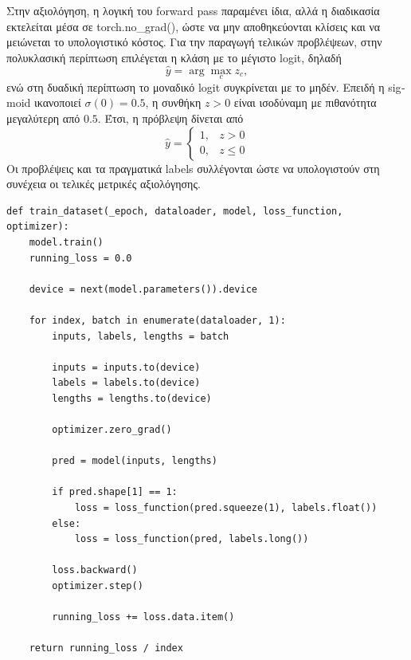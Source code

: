 \documentclass[11pt,a4paper]{article}
\begin{document}
Στην αξιολόγηση, η λογική του \textlatin{forward pass} παραμένει ίδια, αλλά η διαδικασία εκτελείται μέσα σε \textlatin{torch.no\_grad()}, ώστε να 
μην αποθηκεύονται κλίσεις και να μειώνεται το υπολογιστικό κόστος. Για την παραγωγή τελικών προβλέψεων, στην πολυκλασική περίπτωση επιλέγεται η 
κλάση με το μέγιστο \textlatin{logit}, δηλαδή
\[
\hat{y} = \arg\max_c z_c,
\]
ενώ στη δυαδική περίπτωση το μοναδικό \textlatin{logit} συγκρίνεται με το μηδέν. Επειδή η \textlatin{sigmoid} ικανοποιεί \(\sigma(0)=0.5\), η 
συνθήκη \(z>0\) είναι ισοδύναμη με πιθανότητα μεγαλύτερη από \(0.5\). Έτσι, η πρόβλεψη δίνεται από
\[
\hat{y} =
\begin{cases}
1, & z > 0 \\
0, & z \leq 0
\end{cases}
\]
Οι προβλέψεις και τα πραγματικά \textlatin{labels} συλλέγονται ώστε να υπολογιστούν στη συνέχεια οι τελικές μετρικές αξιολόγησης.

\begin{lstlisting}[caption={Code for train\_dataset (training.py)}]
def train_dataset(_epoch, dataloader, model, loss_function, optimizer):
    model.train()
    running_loss = 0.0

    device = next(model.parameters()).device

    for index, batch in enumerate(dataloader, 1):
        inputs, labels, lengths = batch

        inputs = inputs.to(device)
        labels = labels.to(device)
        lengths = lengths.to(device)

        optimizer.zero_grad()

        pred = model(inputs, lengths)

        if pred.shape[1] == 1:
            loss = loss_function(pred.squeeze(1), labels.float())
        else:
            loss = loss_function(pred, labels.long())

        loss.backward()
        optimizer.step()

        running_loss += loss.data.item()

    return running_loss / index
\end{lstlisting}
\end{document}
